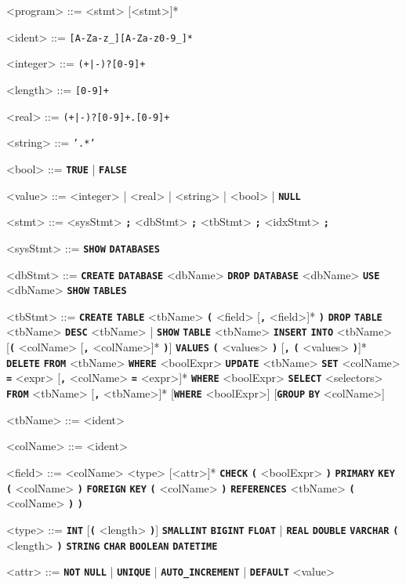 \renewcommand{\t}[1]{\texttt{\textbf{#1}}}

\setlength{\grammarindent}{10em}
\begin{grammar}

<program> ::= <stmt> [<stmt>]*

<ident> ::= \texttt{[A-Za-z_][A-Za-z0-9_]*}

<integer> ::= \texttt{(+|-)?[0-9]+}

<length> ::= \texttt{[0-9]+}

<real> ::= \texttt{(+|-)?[0-9]+.[0-9]+}

<string> ::= \texttt{'.*'}

<bool> ::= \t{TRUE} | \t{FALSE}

<value> ::= <integer> | <real> | <string> | <bool> | \t{NULL}

<stmt> ::= <sysStmt> \t{;}
\alt <dbStmt> \t{;}
\alt <tbStmt> \t{;}
\alt <idxStmt> \t{;}

<sysStmt> ::= \t{SHOW} \t{DATABASES}

<dbStmt> ::= \t{CREATE} \t{DATABASE} <dbName>
\alt \t{DROP} \t{DATABASE} <dbName>
\alt \t{USE} <dbName>
\alt \t{SHOW} \t{TABLES}

<tbStmt> ::= \t{CREATE} \t{TABLE} <tbName> \t{(} <field> [\t{,} <field>]* \t{)}
\alt \t{DROP} \t{TABLE} <tbName>
\alt \t{DESC} <tbName> | \t{SHOW} \t{TABLE} <tbName>
\alt \t{INSERT} \t{INTO} <tbName> [\t{(} <colName> [\t{,} <colName>]* \t{)}] \t{VALUES} \t{(} <values> \t{)} [\t{,} \t{(} <values> \t{)}]*
\alt \t{DELETE} \t{FROM} <tbName> \t{WHERE} <boolExpr>
\alt \t{UPDATE} <tbName> \t{SET} <colName> \t{=} <expr> [\t{,} <colName> \t{=} <expr>]* \t{WHERE} <boolExpr>
\alt \t{SELECT} <selectors> \t{FROM} <tbName> [\t{,} <tbName>]* [\t{WHERE} <boolExpr>] [\t{GROUP} \t{BY} <colName>]

<tbName> ::= <ident>

<colName> ::= <ident>

<field> ::= <colName> <type> [<attr>]*
\alt \t{CHECK} \t{(} <boolExpr> \t{)}
\alt \t{PRIMARY} \t{KEY} \t{(} <colName> \t{)}
\alt \t{FOREIGN} \t{KEY} \t{(} <colName> \t{)} \t{REFERENCES} <tbName> \t{(} <colName> \t{)} \t{)}

<type> ::= \t{INT} [\t{(} <length> \t{)}]
\alt \t{SMALLINT}
\alt \t{BIGINT}
\alt \t{FLOAT} | \t{REAL}
\alt \t{DOUBLE}
\alt \t{VARCHAR} \t{(} <length> \t{)}
\alt \t{STRING}
\alt \t{CHAR}
\alt \t{BOOLEAN}
\alt \t{DATETIME}

<attr> ::= \t{NOT} \t{NULL} | \t{UNIQUE} | \t{AUTO_INCREMENT} | \t{DEFAULT} <value>


\end{grammar}
